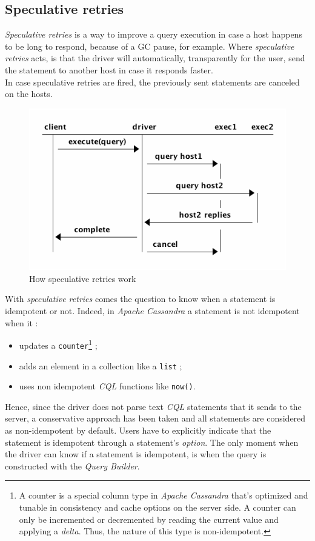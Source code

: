 \documentclass[a4paper]{report}
\newcommand{\ca}{\emph{Apache Cassandra\xspace}}
\newcommand{\sr}{\emph{speculative retries\xspace}}
\begin{document}
\subsection{Speculative retries}
\emph{Speculative retries} is a way to improve a query execution in case a host happens to be long to respond, because of a GC pause, for example. Where \sr{} acts, is that the driver will automatically, transparently for the user, send the statement to another host in case it responds faster.\\
In case speculative retries are fired, the previously sent statements are canceled on the hosts.\\
\begin{figure}[ht!]
\centering
\includegraphics[scale=0.7]{spec_rec.png}
\caption{How speculative retries work \label{overflow}}
\end{figure}
With \sr{} comes the question to know when a statement is idempotent or not. Indeed, in \ca{} a statement is not idempotent when it : 
\begin{itemize}
   \item updates a \verb;counter;\footnote{A counter is a special column type in \ca{} that's optimized and tunable in consistency and cache options on the server side. A counter can only be incremented or decremented by reading the current value and applying a \emph{delta}. Thus, the nature of this type is non-idempotent.} ;
   \item adds an element in a collection like a \verb;list; ;
   \item uses non idempotent \emph{CQL} functions like \verb;now();.
\end{itemize}
Hence, since the driver does not parse text \emph{CQL} statements that it sends to the server, a conservative approach has been taken and all statements are considered as non-idempotent by default. Users have to explicitly indicate that the statement is idempotent through a statement's \emph{option}. The only moment when the driver can know if a statement is idempotent, is when the query is constructed with the \emph{Query Builder}.\\
\end{document}
